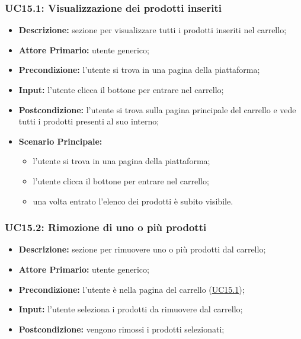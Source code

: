         \subsubsection{UC15.1: Visualizzazione dei prodotti inseriti}
        \label{sec:UC15.1}
        \begin{itemize}
            \item \textbf{Descrizione:} sezione per visualizzare tutti i prodotti inseriti nel carrello;
            \item \textbf{Attore Primario:} utente generico;
            \item \textbf{Precondizione:}  l'utente si trova in una pagina della piattaforma;
            \item \textbf{Input:} l'utente clicca il bottone per entrare nel carrello;
            \item \textbf{Postcondizione:} l'utente si trova sulla pagina principale del carrello e vede tutti i prodotti presenti al suo interno;
            \item \textbf{Scenario Principale:}
                \begin{itemize}
                    \item l'utente si trova in una pagina della piattaforma;
                    \item l'utente clicca il bottone per entrare nel carrello;
                    \item una volta entrato l'elenco dei prodotti è subito visibile.
                \end{itemize}
        \end{itemize}
        \subsubsection{UC15.2: Rimozione di uno o più prodotti}
        \begin{itemize}
            \item \textbf{Descrizione:} sezione per rimuovere uno o più prodotti dal carrello;
            \item \textbf{Attore Primario:} utente generico;
            \item \textbf{Precondizione:} l'utente è nella pagina del carrello (\hyperref[sec:UC15.1]{\underline{UC15.1}});
            \item \textbf{Input:} l'utente seleziona i prodotti da rimuovere dal carrello;
            \item \textbf{Postcondizione:} vengono rimossi i prodotti selezionati;
        \end{itemize}
